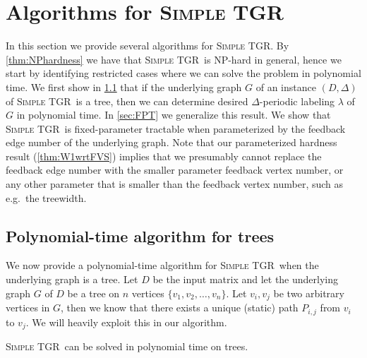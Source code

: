\documentclass[a4paper,UKenglish,cleveref, autoref, thm-restate]{lipics-v2021}
\newcommand{\deltaExact}{\textsc{Simple TGR}}
\begin{document}
\section{Algorithms for \deltaExact}\label{sec:algos}
In this section we provide several algorithms for \deltaExact. By \cref{thm:NPhardness} we have that \deltaExact\ is NP-hard in general, hence we start by identifying restricted cases where we can solve the problem in polynomial time.
We first show in \cref{sec:treealgo} that if the underlying graph $G$ of an instance $(D, \Delta)$ of \deltaExact\ is a tree, then we can determine desired $\Delta$-periodic labeling $\lambda$ of $G$ in polynomial time. In \cref{sec:FPT} we generalize this result. We show that \deltaExact\ is fixed-parameter tractable when parameterized by the feedback edge number of the underlying graph. Note that our parameterized hardness result (\cref{thm:W1wrtFVS}) implies that we presumably cannot replace the feedback edge number with the smaller parameter feedback vertex number, or any other parameter that is smaller than the feedback vertex number, such as e.g.\ the treewidth.





\subsection{Polynomial-time algorithm for trees}\label{sec:treealgo}
We now provide a polynomial-time algorithm for \deltaExact\ when the underlying graph is a tree.
Let $D$ be the input matrix and let the underlying graph $G$ of $D$ be a tree on $n$ vertices $\{v_1, v_2, \dots, v_n\}$.
Let $v_i,v_j$ be two arbitrary vertices in $G$, then we know that there exists a unique (static) path $P_{i,j}$ from $v_i$ to $v_j$. We will heavily exploit this in our algorithm.


\begin{theorem} \label{thm:deltaExact-PolyTimeTrees}
    \deltaExact\ can be solved in polynomial time on trees.
\end{theorem}
\end{document}
